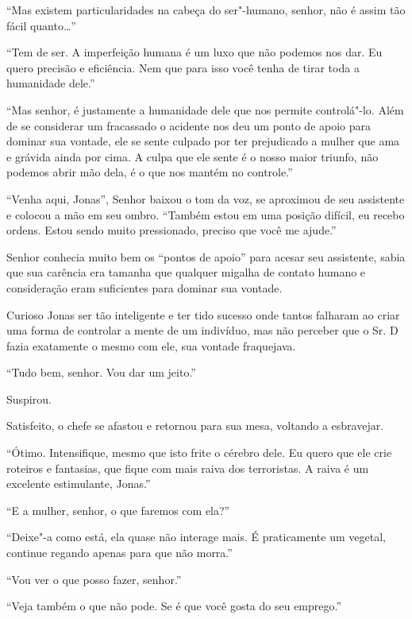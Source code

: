 ``Mas existem particularidades na cabeça do ser"-humano, senhor, não é
assim tão fácil quanto\ldots{}''

``Tem de ser. A imperfeição humana é um luxo que não podemos nos dar. Eu
quero precisão e eficiência. Nem que para isso você tenha de tirar toda
a humanidade dele.''

``Mas senhor, é justamente a humanidade dele que nos permite
controlá"-lo. Além de se considerar um fracassado o acidente nos deu um
ponto de apoio para dominar sua vontade, ele se sente culpado por ter
prejudicado a mulher que ama e grávida ainda por cima. A culpa que ele
sente é o nosso maior triunfo, não podemos abrir mão dela, é o que nos
mantém no controle.''

``Venha aqui, Jonas'', Senhor  baixou o tom da voz, se aproximou de seu
assistente e colocou a mão em seu ombro. ``Também estou em uma posição
difícil, eu recebo ordens. Estou sendo muito pressionado, preciso que
você me ajude.''

Senhor  conhecia muito bem os ``pontos de apoio'' para acesar seu
assistente, sabia que sua carência era tamanha que qualquer migalha de
contato humano e consideração eram suficientes para dominar sua vontade.

Curioso Jonas ser tão inteligente e ter tido sucesso onde tantos
falharam ao criar uma forma de controlar a mente de um indivíduo, mas
não perceber que o Sr. D fazia exatamente o mesmo com ele, sua vontade
fraquejava.

``Tudo bem, senhor. Vou dar um jeito.''

Suspirou.

Satisfeito, o chefe se afastou e retornou para sua mesa, voltando a
esbravejar.

``Ótimo. Intensifique, mesmo que isto frite o cérebro dele. Eu quero que
ele crie roteiros e fantasias, que fique com mais raiva dos terroristas.
A raiva é um excelente estimulante, Jonas.''

``E a mulher, senhor, o que faremos com ela?''

``Deixe"-a como está, ela quase não interage mais. É praticamente um
vegetal, continue regando apenas para que não morra.''

``Vou ver o que posso fazer, senhor.''

``Veja também o que não pode. Se é que você gosta do seu emprego.''

\asterisc


